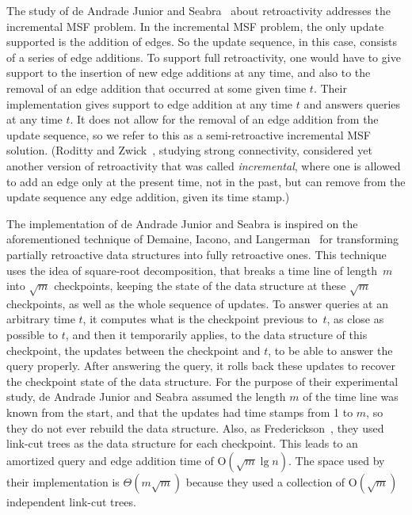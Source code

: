 \documentclass[reqno,11pt]{amsart}
\newcommand{\Oh}{\mathrm{O}}
\begin{document}
The study of de Andrade Junior and Seabra~\cite{deAndradeJrS2022} about retroactivity 
addresses the incremental MSF problem.  In the incremental MSF problem, the only update
supported is the addition of edges.  So the update sequence, in this case, consists 
of a series of edge additions.  To support full retroactivity, one would have to give 
support to the insertion of new edge additions at any time, and also to the removal 
of an edge addition that occurred at some given time $t$.  Their implementation 
gives support to edge addition at any time $t$ and answers queries at any time $t$.  
It does not allow for the removal of an edge addition from the update sequence, 
so we refer to this as a semi-retroactive incremental MSF solution.
(Roditty and Zwick~\cite{RodittyZ2016}, studying strong connectivity, considered
yet another version of retroactivity that was called \emph{incremental}, 
where one is allowed to add an edge only at the present time, not in the past, 
but can remove from the update sequence any edge addition, given its time stamp.) 

The implementation of de Andrade Junior and Seabra is inspired on the
aforementioned technique of Demaine, Iacono, and Langerman~\cite[Theorem~5]{DemaineIL2007}
for transforming partially retroactive data structures into fully retroactive ones.
This technique uses the idea of square-root decomposition,
that breaks a time line of length~$m$ into $\sqrt{m}$ checkpoints, 
keeping the state of the data structure at these $\sqrt{m}$ checkpoints, 
as well as the whole sequence of updates.  
To answer queries at an arbitrary time $t$, 
it computes what is the checkpoint previous to~$t$, as close as possible to $t$, 
and then it temporarily applies, to the data structure of this checkpoint, 
the updates between the checkpoint and $t$, to be able to answer the query properly.  
After answering the query, 
it rolls back these updates to recover the checkpoint state of the data structure.  
For the purpose of their experimental study, de Andrade Junior and Seabra assumed
the length $m$ of the time line was known from the start, and that the updates
had time stamps from 1 to $m$, so they do not ever rebuild the data structure.
Also, as Frederickson~\cite{Frederickson1983}, 
they used link-cut trees as the data structure for each checkpoint.  
This leads to an amortized query and edge addition time of $\Oh(\sqrt{m}\lg n)$.  
The space used by their implementation is $\Theta(m\sqrt{m})$ 
because they used a collection of $\Oh(\sqrt{m})$ independent link-cut trees. 
\end{document}
